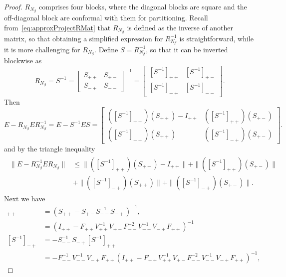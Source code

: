 \begin{proof}
    $R_{N_\beta}$ comprises four blocks, where the diagonal blocks are square
    and the off-diagonal block are conformal with them for partitioning. Recall
    from~\eqref{eq:approxProjectRMat} that $R_{N_\beta}$ is defined as the
    inverse of another matrix, so that obtaining a simplified expression for
    $R_{N_\beta}^{-1}$ is straightforward, while it is more challenging for
    $R_{N_\beta}$. Define $S=R_{N_\beta}^{-1}$, so that it can be inverted
    blockwise as
    \[
        R_{N_\beta}=S^{-1}=
        \begin{bmatrix}
            S_{++} & S_{+-}\\
            S_{-+} & S_{--}
        \end{bmatrix}^{-1}
        =
        \begin{bmatrix}
            [S^{-1}]_{++} & [S^{-1}]_{+-}\\
            [S^{-1}]_{-+} & [S^{-1}]_{--}
        \end{bmatrix}.
    \]
    Then
    \[
    E-R_{N_\beta}E R_{N_\beta}^{-1}
    =
    E-S^{-1} E S
    =
    \begin{bmatrix}
            ([S^{-1}]_{++})(S_{++})- I_{++} &
            ([S^{-1}]_{++})(S_{+-})\\
            ([S^{-1}]_{-+})(S_{++}) &
            ([S^{-1}]_{-+})(S_{+-})
        \end{bmatrix}.
    \]
    and by the triangle inequality
    \begin{align}
    \begin{split}
    \|E-R_{N_\beta}^{-1}E R_{N_\beta}\|
    &\leq
    \|([S^{-1}]_{++})(S_{++}) - I_{++}\|
    +\|([S^{-1}]_{++})(S_{+-})\|\\
    &+\|([S^{-1}]_{-+})(S_{++})\|
    +\|([S^{-1}]_{-+})(S_{+-})\|.
    \end{split}
    \label{eq:errBoundTriangle}
    \end{align} 
    Next we have
    \begin{align*}
        [S^{-1}]_{++}
        &=(S_{++}-S_{+-}S_{--}^{-1}S_{-+})^{-1},\\
        &=(I_{++}-F_{++}V_{++}^{-1}V_{+-}F_{--}^{-2}
        V_{--}^{-1}V_{-+}F_{++})^{-1}\\
        [S^{-1}]_{-+}
        &=-S_{--}^{-1}S_{-+}[S^{-1}]_{++}\\
        &=-F_{--}^{-1}V_{--}^{-1}V_{-+}F_{++}(I_{++}-F_{++}V_{++}^{-1}
        V_{+-}F_{--}^{-2}V_{--}^{-1}V_{-+}F_{++})^{-1},
    \end{align*}

\end{proof}
